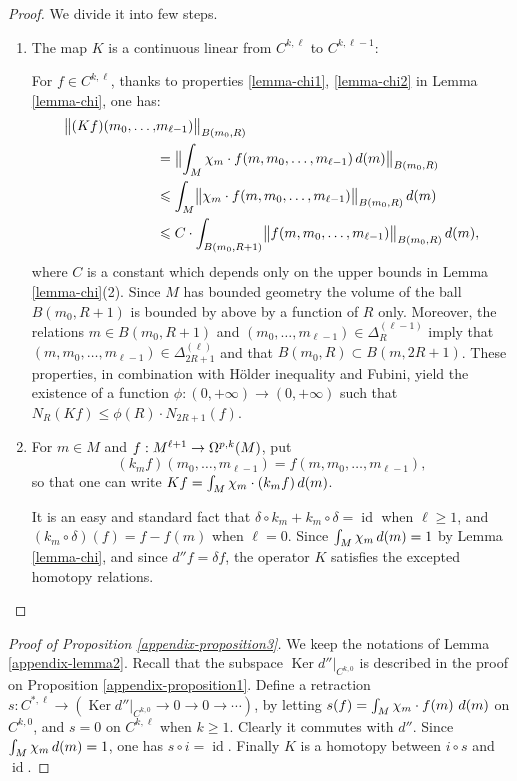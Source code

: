 \documentclass[JEP,XML,SOM,Unicode,published]{cedram}
\newcommand{\NoChangel}[1]{%
\expandafter\let\csname old\string#1\endcsname=#1
\let#1=\relax
\newcommand{#1}{\mathcode`l="716C\csname old\string#1\endcsname\mathcode`l="7160 }%
}
\newcommand{\loc}{\mathrm{loc}}\NoChangel{\loc}
\theoremstyle{plain}
\theoremstyle{remark}
\theoremstyle{definition}
\DeclareMathOperator{\id}{id}
\DeclareMathOperator{\Ker}{Ker}
\DeclareMathOperator{\vol}{vol}\NoChangel{\vol}
\newcommand{\restr}{\big|}
\begin{document}
\begin{proof} We divide it into few steps.
\begin{enumerate}
\item
The map $K$ is a continuous linear from $C^{k, \ell}$ to $C^{k, \ell-1}$:

For $f \in C^{k, \ell}$, thanks to properties \eqref{lemma-chi1}, \eqref{lemma-chi2} in Lemma \ref{lemma-chi}, one has:
\begin{align*}
\bigl\Vert (Kf)(m_0, \dots,& m_{\ell -1}) \bigr\Vert_{B(m_0, R)}\\
&=\bigl\Vert \int_M \chi_m \cdot f(m, m_0, \dots, m_{\ell -1}) \,d\vol(m)
\bigr\Vert_{B(m_0, R)} \\
&\leqslant
\int_M \bigl\Vert \chi_m \cdot f(m, m_0, \dots, m_{\ell -1}) \bigr\Vert_{B(m_0, R)} \,d\vol(m)\\
&\leqslant C \cdot \int_{B(m_0, R+1)}
\bigl\Vert f(m, m_0, \dots, m_{\ell -1}) \bigr\Vert_{B(m_0, R)} \,d\vol(m),
\end{align*}
where $C$ is a constant which depends only on the upper bounds in Lemma \ref{lemma-chi}(2).
Since $M$ has bounded geometry the volume of the ball
$B(m_0, R+1)$ is bounded by above by a function of $R$ only.
Moreover, the relations $m \in B(m_0, R+1)$ and $(m_0, \dots, m_{\ell -1}) \in \Delta_R^{(\ell -1)}$ imply that
$(m, m_0, \dots, m_{\ell -1}) \in \Delta_{2R +1}^{(\ell)}$ and that $B(m_0, R) \subset B(m, 2R+1)$.
These properties, in combination with Hölder inequality and Fubini, yield the existence of
a function $\phi: (0, +\infty) \to (0, +\infty)$ such that
$N_R(Kf) \leqslant \phi(R) \cdot N_{2R+1} (f)$.

\item
For $m \in M$ and $f: M^{\ell +1} \to \Omega_{\loc}^{p,k}(M)$, put
\[(k_m f)(m_0, \dots, m_{\ell -1}) = f(m, m_0, \dots, m_{\ell-1}),\] so that
one can write $Kf = \int_M \chi_m \cdot (k_m f) \,d\vol(m)$.

It is an easy and standard fact that $\delta \circ k_m + k_m \circ \delta = \id$ when $\ell \geqslant 1$, and $(k_m \circ \delta)(f) = f - f(m)$
when $\ell =0$. Since $\int_M \chi_m \,d\vol(m) =1$ by Lemma \ref{lemma-chi}, and since $d''f = \delta f$,
the operator $K$ satisfies the excepted homotopy relations.\qedhere
\end{enumerate}
\end{proof}

\begin{proof}[Proof of Proposition \ref{appendix-proposition3}]
We keep the notations of Lemma \ref{appendix-lemma2}. Recall that the subspace $\Ker d'' \restr_{C^{k, 0}}$ is described
in the proof on Proposition \ref{appendix-proposition1}. Define a retraction
$s: C^{*,\ell} \to (\Ker d'' \restr_{C^{k, 0}} \to 0 \to 0 \to \cdots)$, by letting
$s(f) = \int_M \chi_m \cdot f(m)~ d\vol(m)$ on $C^{k, 0}$, and $s = 0$ on $C^{k, \ell}$
when $k \geqslant 1$. Clearly it commutes with $d''$. Since $\int_M \chi_m \,d\vol(m) =1$, one has $s \circ i = \id$.
Finally $K$ is a homotopy between $i \circ s$ and $\id$.
\end{proof}
\end{document}
